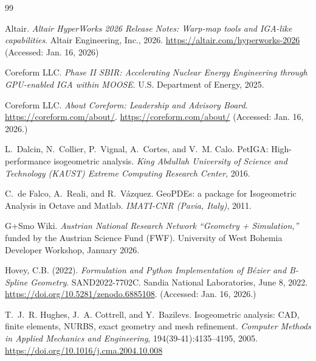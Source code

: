\documentclass[12pt,report,justified]{SANDreport}
\begin{document}



\begin{thebibliography}{99}

Altair.
\newblock \emph{Altair HyperWorks 2026 Release Notes: Warp-map tools and IGA-like capabilities}.
\newblock Altair Engineering, Inc., 2026. \url{https://altair.com/hyperworks-2026} (Accessed: Jan. 16, 2026)

Coreform LLC.
\newblock \emph{Phase II SBIR: Accelerating Nuclear Energy Engineering through GPU-enabled IGA within MOOSE}.
\newblock U.S. Department of Energy, 2025. 

Coreform LLC.
\newblock \emph{About Coreform: Leadership and Advisory Board}.
\newblock \url{https://coreform.com/about/}.  \url{https://coreform.com/about/} (Accessed: Jan. 16, 2026.)

L.~Dalcin, N.~Collier, P.~Vignal, A.~Cortes, and V.~M. Calo.
\newblock PetIGA: High-performance isogeometric analysis.
\newblock \emph{King Abdullah University of Science and Technology (KAUST) Extreme Computing Research Center}, 2016.

C.~de Falco, A.~Reali, and R.~Vázquez.
\newblock GeoPDEs: a package for Isogeometric Analysis in Octave and Matlab.
\newblock \emph{IMATI-CNR (Pavia, Italy)}, 2011.

G+Smo Wiki.
\newblock \emph{Austrian National Research Network ``Geometry + Simulation,''} funded by the Austrian Science Fund (FWF).
\newblock University of West Bohemia Developer Workshop, January 2026.

Hovey, C.B. (2022). \emph{Formulation and Python Implementation of B{\'e}zier and B-Spline Geometry}. SAND2022-7702C. Sandia National Laboratories, June 8, 2022. \url{https://doi.org/10.5281/zenodo.6885108}. (Accessed: Jan. 16, 2026.)

T.~J.~R. Hughes, J.~A. Cottrell, and Y.~Bazilevs.
\newblock Isogeometric analysis: CAD, finite elements, NURBS, exact geometry and mesh refinement.
\newblock \emph{Computer Methods in Applied Mechanics and Engineering}, 194(39-41):4135--4195, 2005. \url{https://doi.org/10.1016/j.cma.2004.10.008}


\end{thebibliography}
\end{document}
